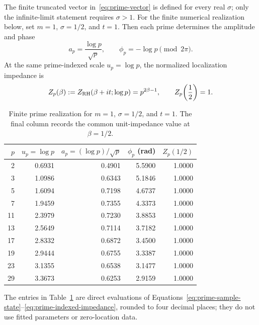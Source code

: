 \documentclass[11pt]{article}
\begin{document}
The finite truncated vector in~\eqref{eq:prime-vector} is defined for every real $\sigma$;
only the infinite-limit statement requires $\sigma>1$.  For the finite numerical realization
below, set $m=1$, $\sigma=1/2$, and $t=1$.  Then each prime
determines the amplitude and phase
\begin{equation}\label{eq:prime-sample-state}
 a_p=\frac{\log p}{\sqrt p},\qquad
 \phi_p=-\log p\pmod{2\pi}.
\end{equation}
At the same prime-indexed scale $u_p=\log p$, the normalized localization impedance is
\begin{equation}\label{eq:prime-indexed-impedance}
 Z_p(\beta):=Z_{\rm RH}(\beta+it;\log p)=p^{2\beta-1},
 \qquad Z_p\!\left(\frac12\right)=1.
\end{equation}

\begin{table}[H]
\centering
\footnotesize
\caption{Finite prime realization for $m=1$, $\sigma=1/2$, and $t=1$.  The final column
records the common unit-impedance value at $\beta=1/2$.}
\label{tab:prime-amplitude-phase}
\begin{tabular}{rrrrr}
\toprule
$p$ & $u_p=\log p$ & $a_p=(\log p)/\sqrt p$ & $\phi_p$ (rad) & $Z_p(1/2)$\\
\midrule
2  & 0.6931 & 0.4901 & 5.5900 & 1.0000\\
3  & 1.0986 & 0.6343 & 5.1846 & 1.0000\\
5  & 1.6094 & 0.7198 & 4.6737 & 1.0000\\
7  & 1.9459 & 0.7355 & 4.3373 & 1.0000\\
11 & 2.3979 & 0.7230 & 3.8853 & 1.0000\\
13 & 2.5649 & 0.7114 & 3.7182 & 1.0000\\
17 & 2.8332 & 0.6872 & 3.4500 & 1.0000\\
19 & 2.9444 & 0.6755 & 3.3387 & 1.0000\\
23 & 3.1355 & 0.6538 & 3.1477 & 1.0000\\
29 & 3.3673 & 0.6253 & 2.9159 & 1.0000\\
\bottomrule
\end{tabular}
\end{table}

The entries in Table~\ref{tab:prime-amplitude-phase} are direct evaluations of
Equations~\eqref{eq:prime-sample-state}--\eqref{eq:prime-indexed-impedance}, rounded to four
decimal places; they do not use fitted parameters or zero-location data.
\end{document}
